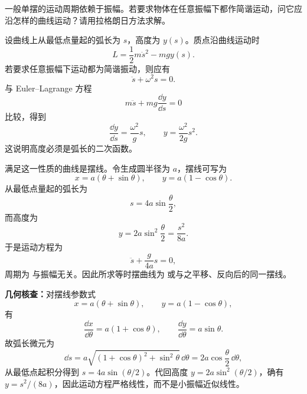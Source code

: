 \begin{question}[等时摆曲线]
一般单摆的运动周期依赖于振幅。若要求物体在任意振幅下都作简谐运动，问它应沿怎样的曲线运动？请用拉格朗日方法求解。

\begin{solution}
设曲线上从最低点量起的弧长为 $s$，高度为 $y(s)$。质点沿曲线运动时
\[
  L=\frac12m\dot s^2-mgy(s).
\]
若要求任意振幅下运动都为简谐振动，则应有
\[
  \ddot s+\omega^2 s=0.
\]
与 Euler--Lagrange 方程
\[
  m\ddot s+mg\frac{\dd y}{\dd s}=0
\]
比较，得到
\[
  \frac{\dd y}{\dd s}=\frac{\omega^2}{g}s,
  \qquad
  y=\frac{\omega^2}{2g}s^2.
\]
这说明高度必须是弧长的二次函数。

满足这一性质的曲线是摆线。令生成圆半径为 $a$，摆线可写为
\[
  x=a(\theta+\sin\theta),
  \qquad
  y=a(1-\cos\theta).
\]
从最低点量起的弧长为
\[
  s=4a\sin\frac\theta2,
\]
而高度为
\[
  y=2a\sin^2\frac\theta2=\frac{s^2}{8a}.
\]
于是运动方程为
\[
  \ddot s+\frac{g}{4a}s=0,
\]
周期为
与振幅无关。因此所求等时摆曲线为
或与之平移、反向后的同一摆线。


\medskip
\textbf{几何核查：}对摆线参数式
\[
  x=a(\theta+\sin\theta),\qquad y=a(1-\cos\theta),
\]
有
\[
  \frac{\dd x}{\dd\theta}=a(1+\cos\theta),
  \qquad
  \frac{\dd y}{\dd\theta}=a\sin\theta.
\]
故弧长微元为
\[
  \dd s=a\sqrt{(1+\cos\theta)^2+\sin^2\theta}\,\dd\theta
  =2a\cos\frac\theta2\,\dd\theta,
\]
从最低点起积分得到 $s=4a\sin(\theta/2)$。代回高度 $y=2a\sin^2(\theta/2)$，确有 $y=s^2/(8a)$，因此运动方程严格线性，而不是小振幅近似线性。
\end{solution}

\end{question}

